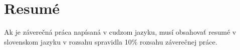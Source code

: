 \chapter*{Resumé}

Ak je záverečná práca  napísaná v cudzom jazyku, musí obsahovať resumé v slovenskom jazyku v rozsahu spravidla 10\% rozsahu záverečnej práce.
